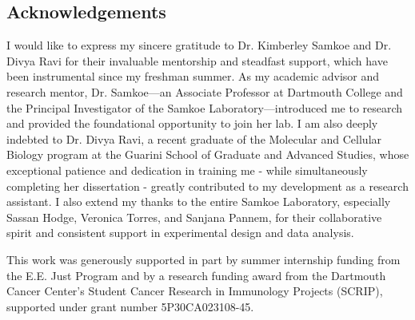 \pagestyle{plain}
\begin{center}


\section*{Acknowledgements}


\end{center}

I would like to express my sincere gratitude to Dr. Kimberley Samkoe and Dr. Divya Ravi for their invaluable mentorship and steadfast support, which have been instrumental since my freshman summer. As my academic advisor and research mentor, Dr. Samkoe—an Associate Professor at Dartmouth College and the Principal Investigator of the Samkoe Laboratory—introduced me to research and provided the foundational opportunity to join her lab. I am also deeply indebted to Dr. Divya Ravi, a recent graduate of the Molecular and Cellular Biology program at the Guarini School of Graduate and Advanced Studies, whose exceptional patience and dedication in training me - while simultaneously completing her dissertation - greatly contributed to my development as a research assistant. I also extend my thanks to the entire Samkoe Laboratory, especially Sassan Hodge, Veronica Torres, and Sanjana Pannem, for their collaborative spirit and consistent support in experimental design and data analysis.

This work was generously supported in part by summer internship funding from the E.E. Just Program and by a research funding award from the Dartmouth Cancer Center’s Student Cancer Research in Immunology Projects (SCRIP), supported under grant number 5P30CA023108-45.

\cleardoublepage
